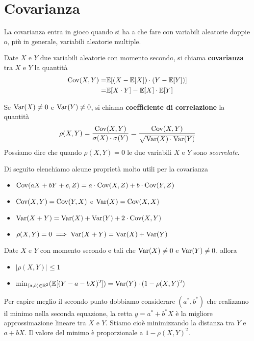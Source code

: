 \section{Covarianza}
La covarianza entra in gioco quando si ha a che fare con variabili aleatorie doppie o, più in
generale, variabili aleatorie multiple.

\begin{definition}
	Date $X$ e $Y$ due variabili aleatorie con momento secondo, si chiama \textbf{covarianza} tra
	$X$ e $Y$ la quantità
	\begin{align*}
		\operatorname{Cov}(X, Y) = & \mathbb{E}[(X - \mathbb{E}[X]) \cdot (Y - \mathbb{E}[Y])] \\
		=            & \mathbb{E}[X \cdot Y] - \mathbb{E}[X] \cdot \mathbb{E}[Y]
	\end{align*}
\end{definition}

\begin{definition}
	Se $\operatorname{Var}(X) \neq 0$ e $\operatorname{Var}(Y) \neq 0$, si chiama \textbf{coefficiente di correlazione} la
	quantità
	\[
		\rho(X,Y) = \frac{\operatorname{Cov}(X, Y)}{\sigma(X) \cdot \sigma(Y)}
		= \frac{\operatorname{Cov}(X, Y)}{\sqrt{\operatorname{Var}(X) \cdot \operatorname{Var}(Y)}}
	\]
	Possiamo dire che quando $\rho(X,Y) = 0$ le due variabili $X$ e $Y$ sono \emph{scorrelate}.
\end{definition}

Di seguito elenchiamo alcune proprietà molto utili per la covarianza
\begin{itemize}
	\item $\operatorname{Cov}(aX + bY + c, Z) = a \cdot \operatorname{Cov}(X, Z) + b \cdot \operatorname{Cov}(Y, Z)$
	\item $\operatorname{Cov}(X,Y) = \operatorname{Cov}(Y,X)$ e $\operatorname{Var}(X) = \operatorname{Cov}(X, X)$
	\item $\operatorname{Var}(X+Y) = \operatorname{Var}(X) + \operatorname{Var}(Y) + 2 \cdot \operatorname{Cov}(X, Y)$
	\item $\rho(X,Y) = 0 \implies \operatorname{Var}(X + Y) = \operatorname{Var}(X) + \operatorname{Var}(Y)$
\end{itemize}

\begin{proposition}
	Date $X$ e $Y$ con momento secondo e tali che $\operatorname{Var}(X) \neq 0$ e $\operatorname{Var}(Y) \neq 0$, allora
	\begin{itemize}
		\item $|\rho(X,Y)| \leq 1$
		\item $\min_{(a,b) \in \mathbb{R}^2} (\mathbb{E}[(Y - a - bX)^2]) = \operatorname{Var}(Y) \cdot (1 - \rho(X,Y)^2)$
	\end{itemize}
\end{proposition}

Per capire meglio il secondo punto dobbiamo considerare $(a^*,b^*)$ che realizzano il minimo
nella seconda equazione, la retta $y = a^* + b^* X$ è la migliore approssimazione lineare tra
$X$ e $Y$. Stiamo cioè minimizzando la distanza tra $Y$ e $a+bX$. Il valore del minimo è
proporzionale a $1 - \rho(X,Y)^2$.

